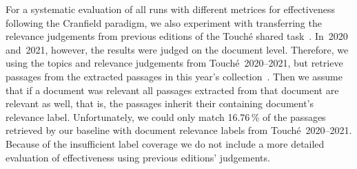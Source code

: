 For a systematic evaluation of all runs with different metrices for effectiveness following the Cranfield paradigm, we also experiment with transferring the relevance judgements from previous editions of the Touché shared task~\cite{BondarenkoFBGAPBSWPH2020,BondarenkoGFBAPBSWPH2021}.
In~2020 and~2021, however, the results were judged on the document level.
Therefore, we using the topics and relevance judgements from Touché~2020--2021, but retrieve passages from the extracted passages in this year's collection~\cite{BondarenkoFKSGBPBSWPH2022}.
Then we assume that if a document was relevant all passages extracted from that document are relevant as well, that is, the passages inherit their containing document's relevance label.
Unfortunately, we could only match 16.76\,\% of the passages retrieved by our baseline with document relevance labels from Touché~2020--2021.
Because of the insufficient label coverage we do not include a more detailed evaluation of effectiveness using previous editions' judgements.

